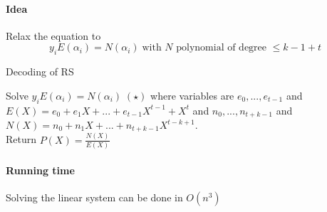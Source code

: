 \documentclass{article}
\begin{document}
\paragraph{Idea} Relax the equation to
\[ y_i E(\alpha_i) = N(\alpha_i) \;\text{with $N$ polynomial of degree $\leq k-1+t$}\]

\begin{algorithm}
\caption{Decoding of RS}
Solve $y_iE(\alpha_i) = N(\alpha_i) \;(\star)$ where variables are $e_0,...,e_{t-1}$ and $E(X)=e_0+e_1X+...+e_{t-1}X^{t-1}+X^t$ and $n_0,...,n_{t+k-1}$ and $N(X)=n_0+n_1X +...+n_{t+k-1}X^{t-k+1}$.\\
Return $P(X)=\frac{N(X)}{E(X)}$
\end{algorithm}

\paragraph{Running time} Solving the linear system can be done in $O(n^3)$
\end{document}

